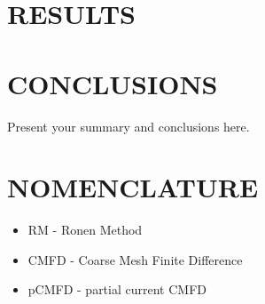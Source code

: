 \documentclass[letterpaper]{physor2020}
\begin{document}
\section{RESULTS} 
\label{sec:res}


\section{CONCLUSIONS}
\label{sec:conc}

Present your summary and conclusions here.





\section*{NOMENCLATURE}

\begin{itemize} \itemsep1pt \parskip0pt 
\item RM - Ronen Method
\item CMFD - Coarse Mesh Finite Difference
\item pCMFD - partial current CMFD
\end{itemize}
\end{document}
